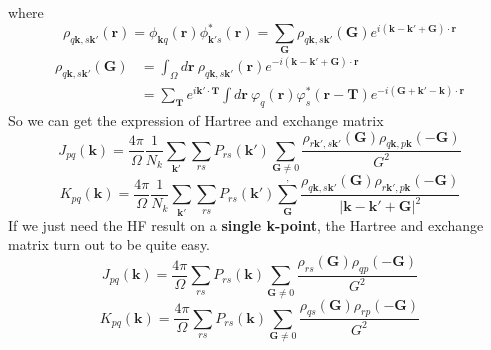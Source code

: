 \documentclass{article}
\begin{document}
            where
            \begin{equation}
                \rho_{q\textbf{k},s\textbf{k}'}(\textbf{r}) = \phi_{\textbf{k}q}(\textbf{r})\phi_{\textbf{k}'s}^*(\textbf{r}) 
                = \sum_{\textbf{G}}\rho_{q\textbf{k},s\textbf{k}'}(\textbf{G})e^{i(\textbf{k}-\textbf{k}'+\textbf{G})\cdot\textbf{r}}
            \end{equation}
            \begin{align}
                \rho_{q\textbf{k},s\textbf{k}'}(\textbf{G}) &= \int_{\Omega}d\textbf{r}\ \rho_{q\textbf{k},s\textbf{k}'}(\textbf{r})
                e^{-i(\textbf{k}-\textbf{k}'+\textbf{G})\cdot\textbf{r}}\\
                & = \sum_{\textbf{T}}e^{i\textbf{k}'\cdot\textbf{T}}\int d\textbf{r}\ \varphi_q(\textbf{r})
                \varphi_s^*(\textbf{r}-\textbf{T})e^{-i(\textbf{G}+\textbf{k}'-\textbf{k})\cdot\textbf{r}}
            \end{align}
            So we can get the expression of Hartree and exchange matrix
            \begin{equation}
                J_{pq}(\textbf{k}) = \frac{4\pi}{\Omega}\frac{1}{N_k}\sum_{\textbf{k}'}\sum_{rs}
                P_{rs}(\textbf{k}')\sum_{\textbf{G}\neq 0}\frac{\rho_{r\textbf{k}',s\textbf{k}'}(\textbf{G})\rho_{q\textbf{k},p\textbf{k}}(-\textbf{G})}{G^2}
            \end{equation}
            \begin{equation}
                K_{pq}(\textbf{k}) = \frac{4\pi}{\Omega}\frac{1}{N_k}\sum_{\textbf{k}'}\sum_{rs}P_{rs}(\textbf{k}')
                \sum_{\textbf{G}}^{,}\frac{\rho_{q\textbf{k},s\textbf{k}'}(\textbf{G})
                \rho_{r\textbf{k}',p\textbf{k}}(-\textbf{G})}{\left|\textbf{k}-\textbf{k}'+\textbf{G}\right|^2}
            \end{equation}
            If we just need the HF result on a \textbf{single k-point},
            the Hartree and exchange matrix turn out to be quite easy.
            \begin{equation}
                J_{pq}(\textbf{k}) = \frac{4\pi}{\Omega}\sum_{rs}P_{rs}(\textbf{k})
                \sum_{\textbf{G}\neq 0}\frac{\rho_{rs}(\textbf{G})\rho_{qp}(-\textbf{G})}{G^2}
            \end{equation}
            \begin{equation}
                K_{pq}(\textbf{k}) = \frac{4\pi}{\Omega}\sum_{rs}P_{rs}(\textbf{k})
                \sum_{\textbf{G}\neq 0}\frac{\rho_{qs}(\textbf{G})\rho_{rp}(-\textbf{G})}{G^2}
            \end{equation}
\end{document}

